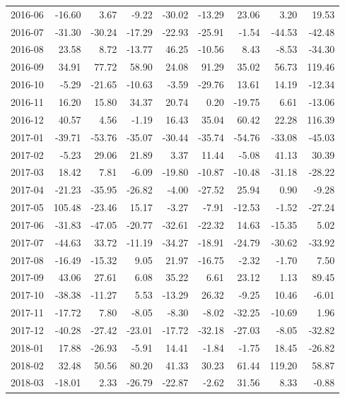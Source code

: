 \begin{table}[ht]
\begin{tabular}{lrrrrrrrr}
  2016-06 & -16.60 & 3.67 & -9.22 & -30.02 & -13.29 & 23.06 & 3.20 & 19.53 \\ 
  2016-07 & -31.30 & -30.24 & -17.29 & -22.93 & -25.91 & -1.54 & -44.53 & -42.48 \\ 
  2016-08 & 23.58 & 8.72 & -13.77 & 46.25 & -10.56 & 8.43 & -8.53 & -34.30 \\ 
  2016-09 & 34.91 & 77.72 & 58.90 & 24.08 & 91.29 & 35.02 & 56.73 & 119.46 \\ 
  2016-10 & -5.29 & -21.65 & -10.63 & -3.59 & -29.76 & 13.61 & 14.19 & -12.34 \\ 
  2016-11 & 16.20 & 15.80 & 34.37 & 20.74 & 0.20 & -19.75 & 6.61 & -13.06 \\ 
  2016-12 & 40.57 & 4.56 & -1.19 & 16.43 & 35.04 & 60.42 & 22.28 & 116.39 \\ 
  2017-01 & -39.71 & -53.76 & -35.07 & -30.44 & -35.74 & -54.76 & -33.08 & -45.03 \\ 
  2017-02 & -5.23 & 29.06 & 21.89 & 3.37 & 11.44 & -5.08 & 41.13 & 30.39 \\ 
  2017-03 & 18.42 & 7.81 & -6.09 & -19.80 & -10.87 & -10.48 & -31.18 & -28.22 \\ 
  2017-04 & -21.23 & -35.95 & -26.82 & -4.00 & -27.52 & 25.94 & 0.90 & -9.28 \\ 
  2017-05 & 105.48 & -23.46 & 15.17 & -3.27 & -7.91 & -12.53 & -1.52 & -27.24 \\ 
  2017-06 & -31.83 & -47.05 & -20.77 & -32.61 & -22.32 & 14.63 & -15.35 & 5.02 \\ 
  2017-07 & -44.63 & 33.72 & -11.19 & -34.27 & -18.91 & -24.79 & -30.62 & -33.92 \\ 
  2017-08 & -16.49 & -15.32 & 9.05 & 21.97 & -16.75 & -2.32 & -1.70 & 7.50 \\ 
  2017-09 & 43.06 & 27.61 & 6.08 & 35.22 & 6.61 & 23.12 & 1.13 & 89.45 \\ 
  2017-10 & -38.38 & -11.27 & 5.53 & -13.29 & 26.32 & -9.25 & 10.46 & -6.01 \\ 
  2017-11 & -17.72 & 7.80 & -8.05 & -8.30 & -8.02 & -32.25 & -10.69 & 1.96 \\ 
  2017-12 & -40.28 & -27.42 & -23.01 & -17.72 & -32.18 & -27.03 & -8.05 & -32.82 \\ 
  2018-01 & 17.88 & -26.93 & -5.91 & 14.41 & -1.84 & -1.75 & 18.45 & -26.82 \\ 
  2018-02 & 32.48 & 50.56 & 80.20 & 41.33 & 30.23 & 61.44 & 119.20 & 58.87 \\ 
  2018-03 & -18.01 & 2.33 & -26.79 & -22.87 & -2.62 & 31.56 & 8.33 & -0.88 \\ 

\end{tabular}
\end{table}
